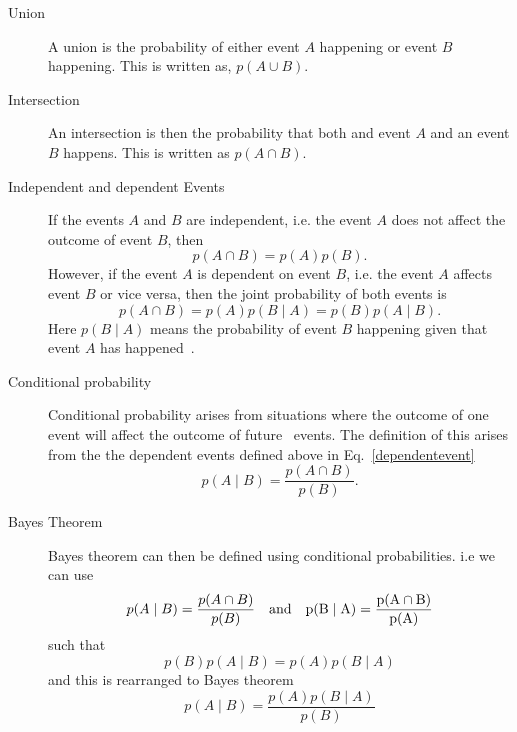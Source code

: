 \begin{description}
	\item [Union]
	A union is the probability of either event $A$ happening or event $B$ happening. This is written as, $p(A \cup B)$.
	
	\item [Intersection]
	An intersection is then the probability that both and event $A$ and an event $B$ happens. This is written as $p(A \cap B)$.
	
	\item [Independent and dependent Events]
	If the events $A$ and $B$ are independent, i.e. the event $A$ does not affect the outcome of event $B$, then
	\begin{equation}
	p(A \cap B) = p(A)p(B).
	\end{equation}
	However, if the event $A$ is dependent on event $B$, i.e. the event $A$ affects event $B$ or vice versa, then the joint probability of both events is
	\begin{equation}
	\label{dependentevent}
	p(A \cap B) = p(A)p(B \mid A) = p(B)p(A \mid B).
	\end{equation}
	Here $p(B \mid A)$ means the probability of event $B$ happening given
that event $A$ has happened~.
	
	\item [Conditional probability]
	Conditional probability arises from situations where the outcome of one
event will affect the outcome of future~ events.
	The definition of this arises from the the dependent events defined above in Eq.~\ref{dependentevent}
	\begin{equation}
	p(A \mid B) = \frac{p(A \cap B)}{p(B)}.
	\end{equation}
	
	\item [Bayes Theorem]
	Bayes theorem can then be defined using conditional probabilities. i.e we can use
	\begin{equation}
	p(A \mid B) = \frac{p(A \cap B)}{p(B)} \quad \rm{and} \quad p(B \mid A) = \frac{p(A \cap B)}{p(A)}
	\end{equation}
	such that
	\begin{equation}
	p(B)p(A \mid B) = p(A)p(B \mid A)
	\end{equation}
	and this is rearranged to Bayes theorem
	\begin{equation}
	p(A \mid B) = \frac{p(A)p(B \mid A)}{p(B)}
	\end{equation}
	
\end{description}

